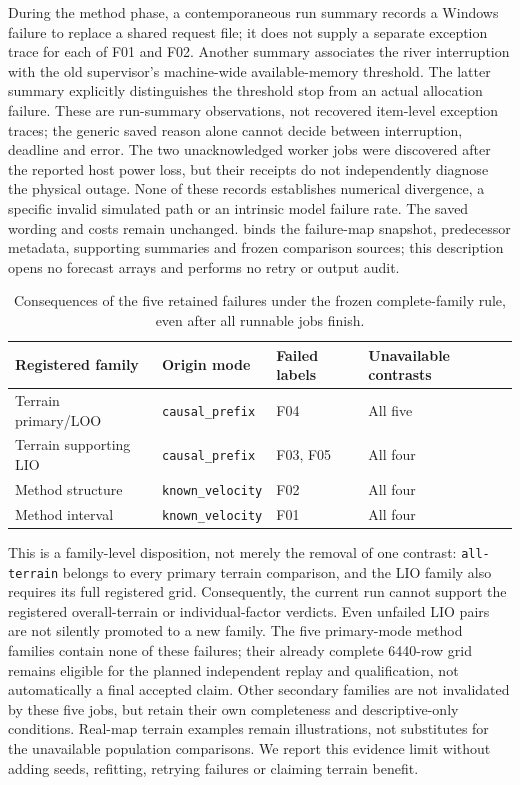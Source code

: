 During the method phase, a contemporaneous run summary records a Windows
failure to replace a shared request file; it does not supply a separate
exception trace for each of F01 and F02. Another summary associates the
river interruption with the old supervisor's machine-wide available-memory threshold. The
latter summary explicitly distinguishes the threshold stop from an actual
allocation failure. These are run-summary observations, not recovered
item-level exception traces; the generic saved reason alone cannot decide
between interruption, deadline and error. The two unacknowledged worker jobs
were discovered after the reported host power loss, but their receipts do
not independently diagnose the physical outage. None of these records
establishes numerical divergence, a specific invalid simulated path or an
intrinsic model failure rate. The saved wording and costs remain unchanged.
 binds the failure-map snapshot,
predecessor metadata, supporting summaries and frozen comparison sources;
this description opens no forecast arrays and performs no retry or output audit.

\begin{table}[htbp]
\centering\small
\caption{Consequences of the five retained failures under the frozen
complete-family rule, even after all runnable jobs finish.}
\label{tab:failure-family-dispositions}\hypertarget{tab:failure-family-dispositions}{}
\begin{tabular}{llll}
\toprule
Registered family & Origin mode & Failed labels & Unavailable contrasts\\
\midrule
Terrain primary/LOO & \texttt{causal\_prefix} & F04 & All five\\
Terrain supporting LIO & \texttt{causal\_prefix} & F03, F05 & All four\\
Method structure & \texttt{known\_velocity} & F02 & All four\\
Method interval & \texttt{known\_velocity} & F01 & All four\\
\bottomrule
\end{tabular}
\end{table}

This is a family-level disposition, not merely the removal of one contrast:
\texttt{all-terrain} belongs to every primary terrain comparison, and the
LIO family also requires its full registered grid. Consequently, the current
run cannot support the registered overall-terrain or individual-factor
verdicts. Even unfailed LIO pairs are not silently promoted to a new family.
The five primary-mode method families contain none of these failures;
their already complete 6440-row grid remains eligible for the planned
independent replay and qualification, not automatically a final accepted
claim. Other secondary families are not invalidated by these five jobs,
but retain their own completeness and descriptive-only conditions.
Real-map terrain examples remain illustrations, not substitutes for the
unavailable population comparisons. We report this evidence limit without
adding seeds, refitting, retrying failures or claiming terrain benefit.


